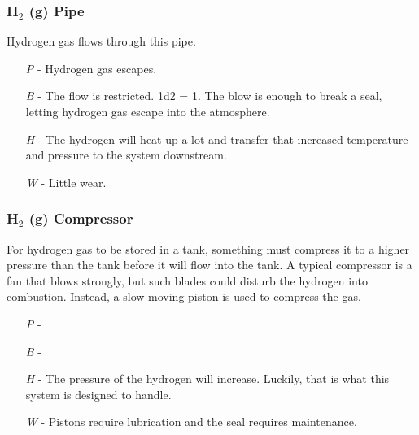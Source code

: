 \documentclass[a4paper]{article}
\begin{document}
\vspace{-0.5cm} \hspace{-18pt} \subsubsection{H$_2$ (g) Pipe} \label{life_h2_pipe} \vspace{-0.2cm}
Hydrogen gas flows through this pipe.
\begin{enumerate}
\item [\textit{P}] - Hydrogen gas escapes.
\item [\textit{B}] - The flow is restricted. \newline \hspace*{3pt} 1d2 = 1. The blow is enough to break a seal, letting hydrogen gas escape into the atmosphere.
\item [\textit{H}] - The hydrogen will heat up a lot and transfer that increased temperature and pressure to the system downstream.
\item [\textit{W}] - Little wear.
\end{enumerate}

\vspace{-0.5cm} \hspace{-18pt} \subsubsection{H$_2$ (g) Compressor} \label{life_h2_compressor} \vspace{-0.2cm}
For hydrogen gas to be stored in a tank, something must compress it to a higher pressure than the tank before it will flow into the tank. A typical compressor is a fan that blows strongly, but such blades could disturb the hydrogen into combustion. Instead, a slow-moving piston is used to compress the gas.
\begin{enumerate}
\item [\textit{P}] -  \\ 
\item [\textit{B}] -  \\
\item [\textit{H}] - The pressure of the hydrogen will increase. Luckily, that is what this system is designed to handle.
\item [\textit{W}] - Pistons require lubrication and the seal requires maintenance.
\end{enumerate}
\end{document}
